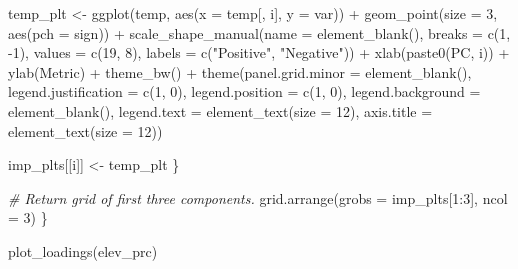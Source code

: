 \documentclass[
]{article}
\newenvironment{Shaded}{\begin{snugshade}}{\end{snugshade}}
\newcommand{\AttributeTok}[1]{\textcolor[rgb]{0.77,0.63,0.00}{#1}}
\newcommand{\CommentTok}[1]{\textcolor[rgb]{0.56,0.35,0.01}{\textit{#1}}}
\newcommand{\DecValTok}[1]{\textcolor[rgb]{0.00,0.00,0.81}{#1}}
\newcommand{\FunctionTok}[1]{\textcolor[rgb]{0.00,0.00,0.00}{#1}}
\newcommand{\NormalTok}[1]{#1}
\newcommand{\OtherTok}[1]{\textcolor[rgb]{0.56,0.35,0.01}{#1}}
\newcommand{\SpecialCharTok}[1]{\textcolor[rgb]{0.00,0.00,0.00}{#1}}
\newcommand{\StringTok}[1]{\textcolor[rgb]{0.31,0.60,0.02}{#1}}
\begin{document}
\begin{Shaded}
\begin{Highlighting}[]
\NormalTok{    temp\_plt }\OtherTok{\textless{}{-}} \FunctionTok{ggplot}\NormalTok{(temp, }\FunctionTok{aes}\NormalTok{(}\AttributeTok{x =}\NormalTok{ temp[, i], }\AttributeTok{y =}\NormalTok{ var)) }\SpecialCharTok{+}
      \FunctionTok{geom\_point}\NormalTok{(}\AttributeTok{size =} \DecValTok{3}\NormalTok{, }\FunctionTok{aes}\NormalTok{(}\AttributeTok{pch =}\NormalTok{ sign)) }\SpecialCharTok{+}
      \FunctionTok{scale\_shape\_manual}\NormalTok{(}\AttributeTok{name =} \FunctionTok{element\_blank}\NormalTok{(),}
                         \AttributeTok{breaks =} \FunctionTok{c}\NormalTok{(}\DecValTok{1}\NormalTok{, }\SpecialCharTok{{-}}\DecValTok{1}\NormalTok{),}
                         \AttributeTok{values =} \FunctionTok{c}\NormalTok{(}\DecValTok{19}\NormalTok{, }\DecValTok{8}\NormalTok{),}
                         \AttributeTok{labels =} \FunctionTok{c}\NormalTok{(}\StringTok{"Positive"}\NormalTok{, }\StringTok{"Negative"}\NormalTok{)) }\SpecialCharTok{+}
      \FunctionTok{xlab}\NormalTok{(}\FunctionTok{paste0}\NormalTok{(}\StringTok{\textquotesingle{}PC\textquotesingle{}}\NormalTok{, i)) }\SpecialCharTok{+}
      \FunctionTok{ylab}\NormalTok{(}\StringTok{\textquotesingle{}Metric\textquotesingle{}}\NormalTok{) }\SpecialCharTok{+}
      \FunctionTok{theme\_bw}\NormalTok{() }\SpecialCharTok{+}
      \FunctionTok{theme}\NormalTok{(}\AttributeTok{panel.grid.minor =} \FunctionTok{element\_blank}\NormalTok{(),}
            \AttributeTok{legend.justification =} \FunctionTok{c}\NormalTok{(}\DecValTok{1}\NormalTok{, }\DecValTok{0}\NormalTok{), }
            \AttributeTok{legend.position =} \FunctionTok{c}\NormalTok{(}\DecValTok{1}\NormalTok{, }\DecValTok{0}\NormalTok{),}
            \AttributeTok{legend.background =} \FunctionTok{element\_blank}\NormalTok{(),}
            \AttributeTok{legend.text =} \FunctionTok{element\_text}\NormalTok{(}\AttributeTok{size =} \DecValTok{12}\NormalTok{),}
            \AttributeTok{axis.title =} \FunctionTok{element\_text}\NormalTok{(}\AttributeTok{size =} \DecValTok{12}\NormalTok{))}
    
\NormalTok{    imp\_plts[[i]] }\OtherTok{\textless{}{-}}\NormalTok{ temp\_plt}
\NormalTok{  \}}
  
  \CommentTok{\# Return grid of first three components.}
  \FunctionTok{grid.arrange}\NormalTok{(}\AttributeTok{grobs =}\NormalTok{ imp\_plts[}\DecValTok{1}\SpecialCharTok{:}\DecValTok{3}\NormalTok{], }\AttributeTok{ncol =} \DecValTok{3}\NormalTok{)}
\NormalTok{\}}

\FunctionTok{plot\_loadings}\NormalTok{(elev\_prc)}
\end{Highlighting}
\end{Shaded}
\end{document}
